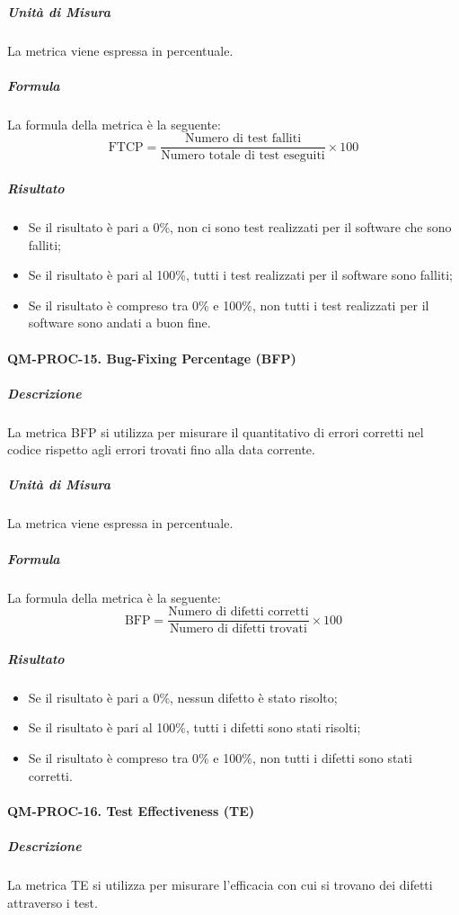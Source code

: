 			\subparagraph{Unità di Misura}
			La metrica viene espressa in percentuale.

			\subparagraph{Formula}
			La formula della metrica è la seguente:
			\[
				\text{FTCP} = \frac{\text{Numero di test falliti}}{\text{Numero totale di test eseguiti}} \times 100
			\]

			\subparagraph{Risultato}
			\begin{itemize}
				\item Se il risultato è pari a 0\%, non ci sono test realizzati per il software che sono falliti;
				\item Se il risultato è pari al 100\%, tutti i test realizzati per il software sono falliti;
				\item Se il risultato è compreso tra 0\% e 100\%, non tutti i test realizzati per il software sono andati a buon fine.
			\end{itemize}

		\paragraph{QM-PROC-15. Bug-Fixing Percentage (BFP)}

			\subparagraph{Descrizione}
			La metrica BFP si utilizza per misurare il quantitativo di errori corretti nel codice rispetto agli errori trovati fino alla data corrente.

			\subparagraph{Unità di Misura}
			La metrica viene espressa in percentuale.

			\subparagraph{Formula}
			La formula della metrica è la seguente:
			\[
				\text{BFP} = \frac{\text{Numero di difetti corretti}}{\text{Numero di difetti trovati}} \times 100
			\]

			\subparagraph{Risultato}
			\begin{itemize}
				\item Se il risultato è pari a 0\%, nessun difetto è stato risolto;
				\item Se il risultato è pari al 100\%, tutti i difetti sono stati risolti;
				\item Se il risultato è compreso tra 0\% e 100\%, non tutti i difetti sono stati corretti.
			\end{itemize}

		\paragraph{QM-PROC-16. Test Effectiveness (TE)}

			\subparagraph{Descrizione}
			La metrica TE si utilizza per misurare l'efficacia con cui si trovano dei difetti attraverso i test.

